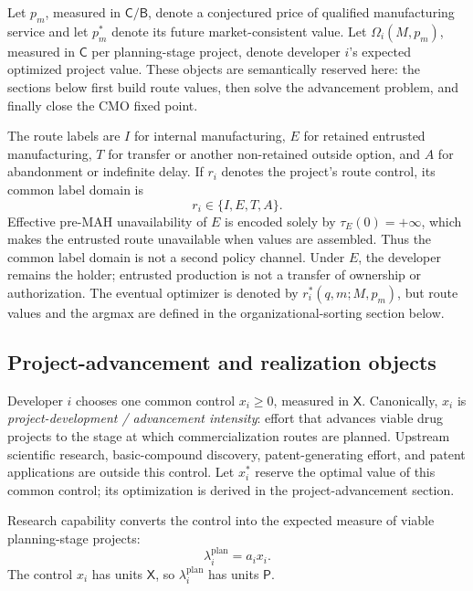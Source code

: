 Let \(p_m\), measured in \(\mathsf C/\mathsf B\), denote a conjectured price
of qualified manufacturing service and let \(p_m^*\) denote its future
market-consistent value.  Let \(\Omega_i(M,p_m)\), measured in \(\mathsf C\)
per planning-stage project, denote developer \(i\)'s expected optimized project
value.  These objects are semantically reserved here: the sections below first
build route values, then solve the advancement problem, and finally close the
CMO fixed point.

The route labels are \(I\) for internal manufacturing, \(E\) for retained
entrusted manufacturing, \(T\) for transfer or another non-retained outside
option, and \(A\) for abandonment or indefinite delay.  If \(r_i\) denotes the
project's route control, its common label domain is
\begin{equation}
  r_i\in\{I,E,T,A\}.
  \label{eq:p01-route-domain}
\end{equation}
Effective pre-MAH unavailability of \(E\) is encoded solely by
\(\tau_E(0)=+\infty\), which makes the entrusted route unavailable when values are assembled.  Thus the common label domain is not a second policy channel.
Under \(E\), the developer remains the holder; entrusted production is not a
transfer of ownership or authorization.  The eventual optimizer is denoted by
\(r_i^*(q,m;M,p_m)\), but route values and the argmax are defined in the
organizational-sorting section below.

\subsection{Project-advancement and realization objects}
\label{subsec:p01-advancement-realization}

Developer \(i\) chooses one common control \(x_i\geq0\), measured in
\(\mathsf X\).  Canonically, \(x_i\) is
\emph{project-development / advancement intensity}: effort that advances
viable drug projects to the stage at which commercialization routes are
planned. Upstream scientific research, basic-compound discovery,
patent-generating effort, and patent applications are outside this control.
Let \(x_i^*\) reserve the optimal value of this common control; its
optimization is derived in the project-advancement section.

Research capability converts the control into the expected measure of viable
planning-stage projects:
\begin{equation}
  \lambda_i^{\mathrm{plan}}=a_ix_i.
  \label{eq:p01-planned-intensity}
\end{equation}
The control \(x_i\) has units \(\mathsf X\), so
\(\lambda_i^{\mathrm{plan}}\) has units \(\mathsf P\).

